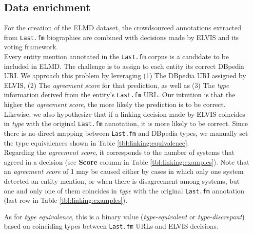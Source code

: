 


\subsection{Data enrichment}
\label{sec:linking:enrichment}

For the creation of the ELMD dataset, the crowdsourced annotations extracted from \texttt{Last.fm} biographies are combined with decisions made by \textsc{ELVIS} and its voting framework.\\%

Every entity mention annotated in the \texttt{Last.fm} corpus is a candidate to be included in \textsc{ELMD}. The challenge is to assign to each entity its correct DBpedia URI. We approach this problem by leveraging (1) The DBpedia URI assigned by \textsc{ELVIS}, (2) The \textit{agreement score} for that prediction, as well as (3) The \textit{type} information derived from the entity's \texttt{Last.fm} URL. Our intuition is that the higher the \textit{agreement score}, the more likely the prediction is to be correct. Likewise, we also hypothesize that if a linking decision made by \textsc{ELVIS} coincides in \textit{type} with the original \texttt{Last.fm} annotation, it is more likely to be correct. Since there is no direct mapping between \texttt{Last.fm} and DBpedia types, we manually set the type equivalences shown in Table \ref{tbl:linking:equivalence}.\\

Regarding the \textit{agreement score}, it corresponds to the number of systems that agreed in a decision (see \textbf{Score} column in Table \ref{tbl:linking:examples}). Note that an \textit{agreement score} of 1 may be caused either by cases in which only one system detected an entity mention, or when there is disagreement among systems, but one and only one of them coincides in \textit{type} with the original \texttt{Last.fm} annotation (last row in Table \ref{tbl:linking:examples}).

As for \textit{type equivalence}, this is a binary value (\textit{type-equivalent} or \textit{type-discrepant}) based on coinciding types between \texttt{Last.fm} URLs and \textsc{ELVIS} decisions.

